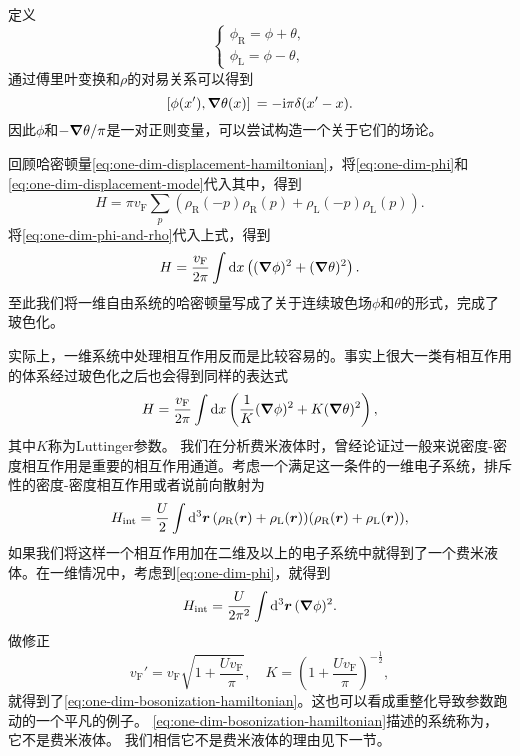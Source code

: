 定义
\begin{equation}
    \begin{cases}
        {\phi}_\text{R} = {\phi} + {\theta}, \\
        {\phi}_\text{L} = {\phi} - {\theta},
    \end{cases}
\end{equation}
通过傅里叶变换和${\rho}$的对易关系可以得到
\begin{equation}
    \comm*{{\phi}(x')}{\grad {\theta}(x)} = -\ii \pi \delta(x' - x).
\end{equation}
因此$\phi$和$- \grad{\theta} / \pi$是一对正则变量，可以尝试构造一个关于它们的场论。

回顾哈密顿量\eqref{eq:one-dim-displacement-hamiltonian}，将\eqref{eq:one-dim-phi}和\eqref{eq:one-dim-displacement-mode}代入其中，得到
\[
    {H} = \pi v_\text{F} \sum_p \left( {\rho}_\text{R}(-p) {\rho}_\text{R}(p) + {\rho}_\text{L}(-p) {\rho}_\text{L}(p) \right).
\]
将\eqref{eq:one-dim-phi-and-rho}代入上式，得到
\begin{equation}
    H = \frac{v_\text{F}}{2\pi} \int \dd{x} \left( (\grad{\phi})^2 + (\grad{\theta})^2 \right).
\end{equation}
至此我们将一维自由系统的哈密顿量写成了关于连续玻色场$\phi$和$\theta$的形式，完成了玻色化。

实际上，一维系统中处理相互作用反而是比较容易的。事实上很大一类有相互作用的体系经过玻色化之后也会得到同样的表达式
\begin{equation}
    H = \frac{v_\text{F}}{2\pi} \int \dd{x} \left( \frac{1}{K} (\grad{\phi})^2 + K (\grad{\theta})^2 \right),
    \label{eq:one-dim-bosonization-hamiltonian}
\end{equation}
其中$K$称为Luttinger参数。
我们在分析费米液体时，曾经论证过一般来说密度-密度相互作用是重要的相互作用通道。考虑一个满足这一条件的一维电子系统，排斥性的密度-密度相互作用或者说前向散射为
\begin{equation}
    {H}_\text{int} = \frac{U}{2} \int \dd[3]{\vb*{r}} ({\rho}_\text{R}(\vb*{r}) + {\rho}_\text{L}(\vb*{r})) ({\rho}_\text{R}(\vb*{r}) + {\rho}_\text{L}(\vb*{r})),
\end{equation}
如果我们将这样一个相互作用加在二维及以上的电子系统中就得到了一个费米液体。在一维情况中，考虑到\eqref{eq:one-dim-phi}，就得到
\begin{equation}
    {H}_\text{int} = \frac{U}{2\pi^2} \int \dd[3]{\vb*{r}} (\grad{\phi})^2.
\end{equation}
做修正
\begin{equation}
    v_\text{F}' = v_\text{F} \sqrt{1 + \frac{U v_\text{F}}{\pi}}, \quad K = \left( 1 + \frac{U v_\text{F}}{\pi} \right)^{- \frac{1}{2}},
\end{equation}
就得到了\eqref{eq:one-dim-bosonization-hamiltonian}。这也可以看成重整化导致参数跑动的一个平凡的例子。
\eqref{eq:one-dim-bosonization-hamiltonian}描述的系统称为，它不是费米液体。
我们相信它不是费米液体的理由见下一节。

